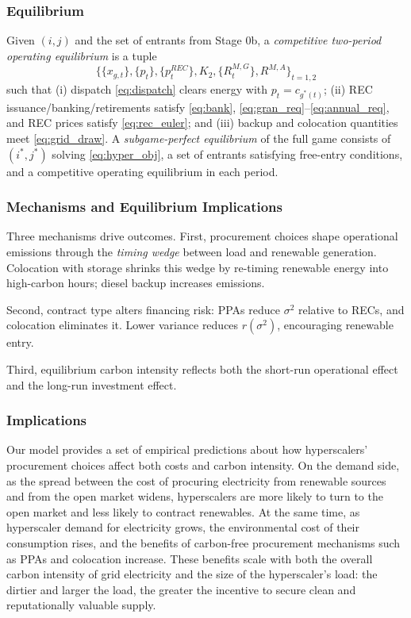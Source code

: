 \documentclass[a4paper,fleqn,longmktitle]{cas-sc}
\begin{document}
\subsubsection{Equilibrium}

Given $(i,j)$ and the set of entrants from Stage 0b, a \emph{competitive two-period operating equilibrium} is a tuple 
\[
\big\{\{x_{g,t}\}, \{p_t\}, \{p^{REC}_t\}, K_2, \{R^{M,G}_t\}, R^{M,A}\big\}_{t=1,2}
\]
such that (i) dispatch \eqref{eq:dispatch} clears energy with $p_t=c_{g^*(t)}$; (ii) REC issuance/banking/retirements satisfy \eqref{eq:bank}, \eqref{eq:gran_req}--\eqref{eq:annual_req}, and REC prices satisfy \eqref{eq:rec_euler}; and (iii) backup and colocation quantities meet \eqref{eq:grid_draw}. A \emph{subgame-perfect equilibrium} of the full game consists of $(i^*,j^*)$ solving \eqref{eq:hyper_obj}, a set of entrants satisfying free-entry conditions, and a competitive operating equilibrium in each period.


\subsubsection{Mechanisms and Equilibrium Implications}

Three mechanisms drive outcomes. First, procurement choices shape operational emissions through the
\emph{timing wedge} between load and renewable generation. Colocation with storage shrinks this wedge by re-timing renewable energy into high-carbon hours; diesel backup increases emissions. 

Second, contract type alters financing risk: PPAs reduce $\sigma^2$ relative to RECs, and colocation eliminates it. Lower variance reduces $r(\sigma^2)$, encouraging renewable entry. 

Third, equilibrium carbon intensity reflects both the short-run operational effect and the long-run investment effect. 

\subsubsection{Implications}

Our model provides a set of empirical predictions about how hyperscalers’ procurement choices affect both costs and carbon intensity. On the demand side, as the spread between the cost of procuring electricity from renewable sources and from the open market widens, hyperscalers are more likely to turn to the open market and less likely to contract renewables. At the same time, as hyperscaler demand for electricity grows, the environmental cost of their consumption rises, and the benefits of carbon-free procurement mechanisms such as PPAs and colocation increase. These benefits scale with both the overall carbon intensity of grid electricity and the size of the hyperscaler’s load: the dirtier and larger the load, the greater the incentive to secure clean and reputationally valuable supply.
\end{document}
